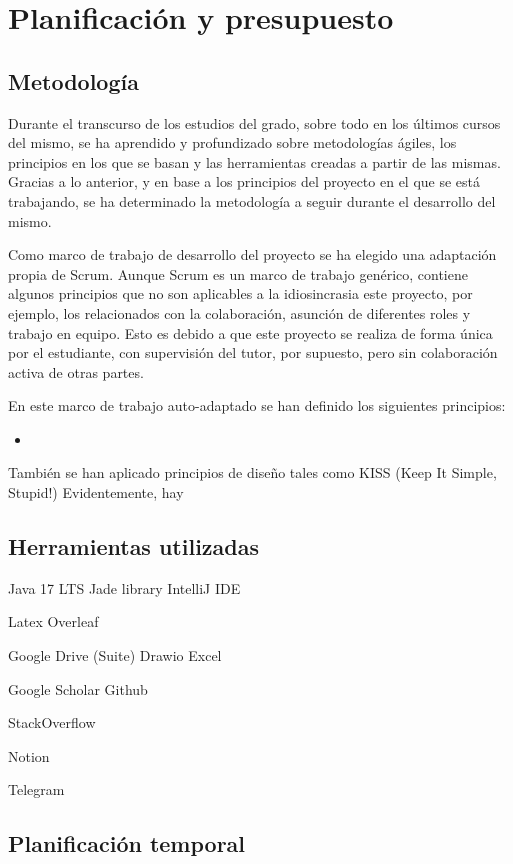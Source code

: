 \chapter{Planificación y presupuesto}
\section{Metodología}
Durante el transcurso de los estudios del grado, sobre todo en los últimos cursos del mismo, se ha aprendido y profundizado sobre metodologías ágiles, los principios en los que se basan y las herramientas creadas a partir de las mismas. Gracias a lo anterior, y en base a los principios del proyecto en el que se está trabajando, se ha determinado la metodología a seguir durante el desarrollo del mismo.

Como marco de trabajo de desarrollo del proyecto se ha elegido una adaptación propia de Scrum. Aunque Scrum es un marco de trabajo genérico, contiene algunos principios que no son aplicables a la idiosincrasia este proyecto, por ejemplo, los relacionados con la colaboración, asunción de diferentes roles y trabajo en equipo. Esto es debido a que este proyecto se realiza de forma única por el estudiante, con supervisión del tutor, por supuesto, pero sin colaboración activa de otras partes. 

En este marco de trabajo auto-adaptado se han definido los siguientes principios:
\begin{itemize}
    \item 
\end{itemize}
También se han aplicado principios de diseño tales como KISS (Keep It Simple, Stupid!)
Evidentemente, hay 

\section{Herramientas utilizadas}

Java 17 LTS
Jade library
IntelliJ IDE

Latex
Overleaf

Google Drive (Suite)
Drawio
Excel

Google Scholar
Github

StackOverflow

Notion

Telegram

\section{Planificación temporal}

